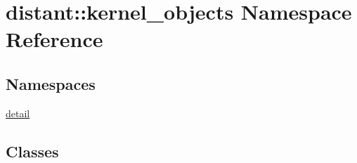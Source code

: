 \hypertarget{namespacedistant_1_1kernel__objects}{}\section{distant\+:\+:kernel\+\_\+objects Namespace Reference}
\label{namespacedistant_1_1kernel__objects}
\subsection*{Namespaces}
\begin{DoxyCompactItemize}
\item 
 \mbox{\hyperlink{namespacedistant_1_1kernel__objects_1_1detail}{detail}}
\end{DoxyCompactItemize}
\subsection*{Classes}
